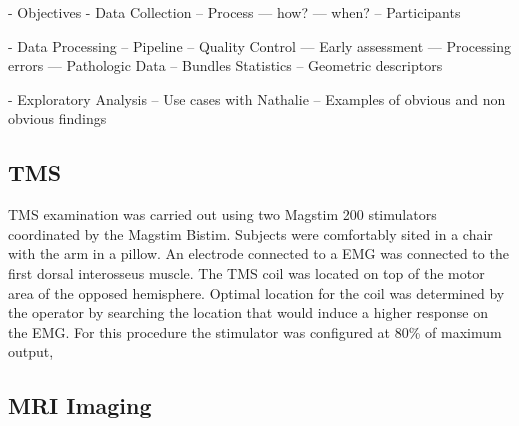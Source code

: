 

 - Objectives
 - Data Collection
 -- Process
 --- how?
 --- when?
 -- Participants

 
 - Data Processing
 -- Pipeline
 -- Quality Control
 --- Early assessment
 --- Processing errors
 --- Pathologic Data
 -- Bundles Statistics
 -- Geometric descriptors

 - Exploratory Analysis
 -- Use cases with Nathalie
 -- Examples of obvious and non obvious findings

\subsection{TMS}
TMS examination was carried out using two Magstim 200 stimulators coordinated by the Magstim Bistim. Subjects were comfortably sited in a chair with the arm in a pillow. An electrode connected to a EMG was connected to the first dorsal interosseus muscle. The TMS coil was located on top of the motor area of the opposed hemisphere. Optimal location for the coil was determined by the operator by searching the location that would induce a higher response on the EMG. For this procedure the stimulator was configured at 80\% of maximum output, 


\subsection{MRI Imaging}


